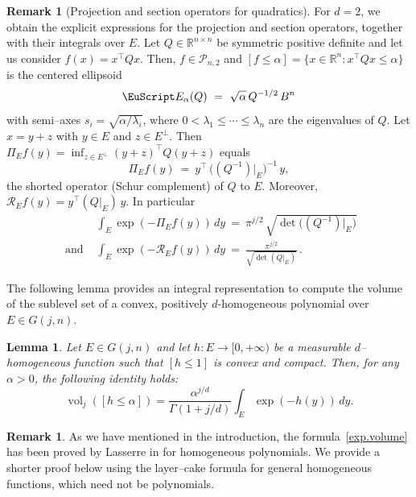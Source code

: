 \documentclass[11pt]{article}
\newtheorem{lemma}[theorem]{Lemma}
\theoremstyle{definition}
\numberwithin{equation}{section}
\newtheorem{remark}[theorem]{Remark}
\newcommand{\R}{\mathbb{R}}
\newcommand{\cP}{\mathcal{P}}        %
\DeclareMathOperator{\vol}{vol}
\begin{document}
\begin{remark}[Projection and section operators for quadratics]\label{rem:PiE-quad}
For $d = 2$, we obtain the explicit expressions for the projection and section operators, together with their integrals over $E$.
Let $Q \in \R^{n\times n}$ be symmetric positive definite and let us consider $f(x) = x^\top Q x$.
Then, $f \in \cP_{n, 2}$ and $[f \le \alpha]=\{x \in \R^n: x^\top Qx\le\alpha\}$ is the centered ellipsoid
\[
\EuScript E_\alpha(Q)\ =\ \sqrt{\alpha}\,Q^{-1/2}\,B^n
\]
with semi–axes $s_i=\sqrt{\alpha/\lambda_i}$, where $0<\lambda_1\le\cdots\le\lambda_n$ are the eigenvalues of $Q$. 
Let $x=y+z$ with $y\in E$ and $z\in E^\perp$.
Then $\Pi_E f(y)=\inf_{z\in E^\perp}(y+z)^\top Q (y+z)$ equals
\[
\Pi_E f(y)\ =\ y^\top\,\big((Q^{-1})|_E\big)^{-1}\,y,
\]
the shorted operator (Schur complement) of $Q$ to $E$. Moreover,
$\mathscr R_E f(y)=y^\top (Q|_E)\,y$. In particular
\begin{align*}
& \int_E \exp(-\Pi_E f(y))\,dy\ =\ \pi^{j/2}\,\sqrt{\det\big((Q^{-1})|_E\big)}\! \\
\text{ and } &
\int_E \exp(-\mathscr R_E f(y)) \,dy\ =\ \frac{\pi^{j/2}}{\sqrt{\det(Q|_E)}}\,.
\end{align*}
\end{remark}

The following lemma provides an integral representation to compute the volume of the sublevel set of a convex, positively $d$-homogeneous polynomial over $E \in G(j,n)$.

\begin{lemma}\label{lem.vol_j}
     Let $E \in G(j, n)$ and let $h: E \to [0, + \infty)$ be a measurable $d$--homogeneous function such that $[h \leq 1]$ is convex and compact. 
     Then, for any $\alpha > 0$, the following identity holds:
     \begin{equation}\label{exp.volume}
         \vol_j([h \leq \alpha]) = \dfrac{\alpha^{j/d}}{\Gamma(1 + j/d)} \int_E \exp(- h(y)) \, dy.
     \end{equation}
\end{lemma}

\begin{remark}
    As we have mentioned in the introduction, the formula~\eqref{exp.volume} has been proved  by Lasserre in \cite[Theorem 2.2]{La_2015} for homogeneous polynomials.
     We provide a shorter proof below using the layer–cake formula for general homogeneous functions, which need not be polynomials.
\end{remark}
\end{document}
